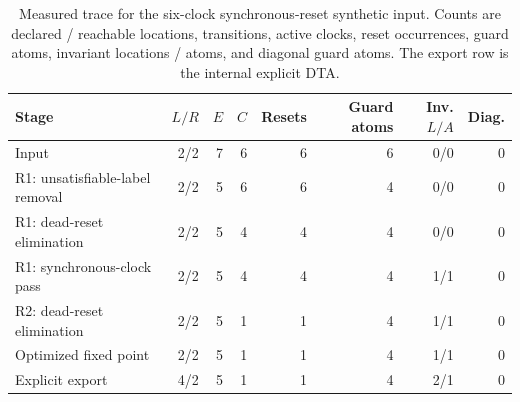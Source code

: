 \begin{table}[t]
\centering
\caption{Measured trace for the six-clock synchronous-reset synthetic input. Counts are declared / reachable locations, transitions, active clocks, reset occurrences, guard atoms, invariant locations / atoms, and diagonal guard atoms. The export row is the internal explicit DTA.}
\label{tab:synchronous-trace}
\scriptsize
\setlength{\tabcolsep}{3pt}
\begin{tabular}{@{}p{}rrrrrrr@{}}
\toprule
Stage & $L/R$ & $E$ & $C$ & Resets & Guard atoms & Inv. $L/A$ & Diag.\\
\midrule
Input & 2/2 & 7 & 6 & 6 & 6 & 0/0 & 0 \\
R1: unsatisfiable-label removal & 2/2 & 5 & 6 & 6 & 4 & 0/0 & 0 \\
R1: dead-reset elimination & 2/2 & 5 & 4 & 4 & 4 & 0/0 & 0 \\
R1: synchronous-clock pass & 2/2 & 5 & 4 & 4 & 4 & 1/1 & 0 \\
R2: dead-reset elimination & 2/2 & 5 & 1 & 1 & 4 & 1/1 & 0 \\
Optimized fixed point & 2/2 & 5 & 1 & 1 & 4 & 1/1 & 0 \\
Explicit export & 4/2 & 5 & 1 & 1 & 4 & 2/1 & 0 \\
\bottomrule
\end{tabular}
\end{table}
